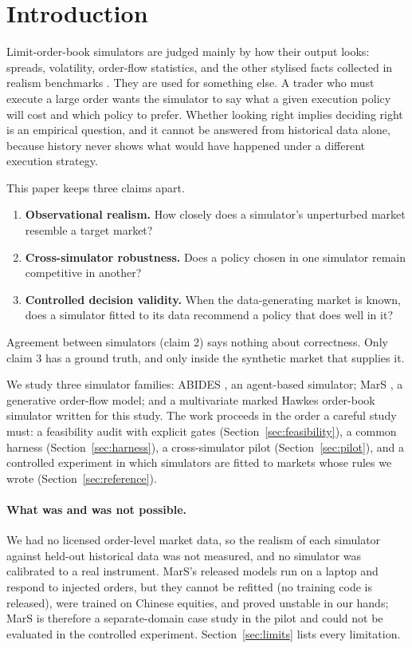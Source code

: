 \section{Introduction}

Limit-order-book simulators are judged mainly by how their output looks: spreads, volatility, order-flow statistics, and the other stylised facts collected in realism benchmarks \citep{vyetrenko2020getreal,nagy2025lobbench}. They are used for something else. A trader who must execute a large order wants the simulator to say what a given execution policy will cost and which policy to prefer. Whether looking right implies deciding right is an empirical question, and it cannot be answered from historical data alone, because history never shows what would have happened under a different execution strategy.

This paper keeps three claims apart.
\begin{enumerate}[leftmargin=*,itemsep=2pt]
\item \textbf{Observational realism.} How closely does a simulator's unperturbed market resemble a target market?
\item \textbf{Cross-simulator robustness.} Does a policy chosen in one simulator remain competitive in another?
\item \textbf{Controlled decision validity.} When the data-generating market is known, does a simulator fitted to its data recommend a policy that does well in it?
\end{enumerate}
Agreement between simulators (claim 2) says nothing about correctness. Only claim 3 has a ground truth, and only inside the synthetic market that supplies it.

We study three simulator families: ABIDES \citep{byrd2019abides,amrouni2021abidesgym}, an agent-based simulator; MarS \citep{li2025mars}, a generative order-flow model; and a multivariate marked Hawkes order-book simulator \citep{bacry2015hawkes} written for this study. The work proceeds in the order a careful study must: a feasibility audit with explicit gates (Section~\ref{sec:feasibility}), a common harness (Section~\ref{sec:harness}), a cross-simulator pilot (Section~\ref{sec:pilot}), and a controlled experiment in which simulators are fitted to markets whose rules we wrote (Section~\ref{sec:reference}).

\paragraph{What was and was not possible.} We had no licensed order-level market data, so the realism of each simulator against held-out historical data was not measured, and no simulator was calibrated to a real instrument. MarS's released models run on a laptop and respond to injected orders, but they cannot be refitted (no training code is released), were trained on Chinese equities, and proved unstable in our hands; MarS is therefore a separate-domain case study in the pilot and could not be evaluated in the controlled experiment. Section~\ref{sec:limits} lists every limitation.

